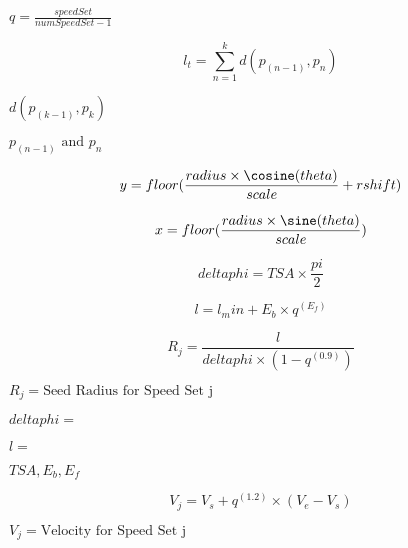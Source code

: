 \documentclass{article}
\begin{document}
$ q= \frac{speedSet}{numSpeedSet-1} $
\pagebreak

\[ l_t = \sum\limits_{n=1}^k d(p_(n-1), p_n) \]
\pagebreak

$ d(p_(k-1), p_k) $
\pagebreak

$ p_(n-1) \text{ and } p_n $
\pagebreak

\[ y = floor(\frac{radius \times \cosine(theta)}{scale}+rshift) \]
\pagebreak

\[ x = floor(\frac{radius \times \sine(theta)}{scale}) \]
\pagebreak

\[ delta phi = TSA \times \frac{pi}{2} \]
\pagebreak

\[ l = l_min + E_b \times q^(E_f) \]
\pagebreak

\[ R_j = \frac{l}{delta phi \times (1-q^(0.9))} \]
\pagebreak

$ R_j = \text{Seed Radius for Speed Set j} $
\pagebreak

$ delta phi =$
\pagebreak

$ l=$
\pagebreak

$ TSA, E_b, E_f$
\pagebreak

\[ V_j = V_s+q^(1.2) \times (V_e-V_s) \]
\pagebreak

$ V_j = \text{Velocity for Speed Set j} $
\pagebreak
\end{document}
